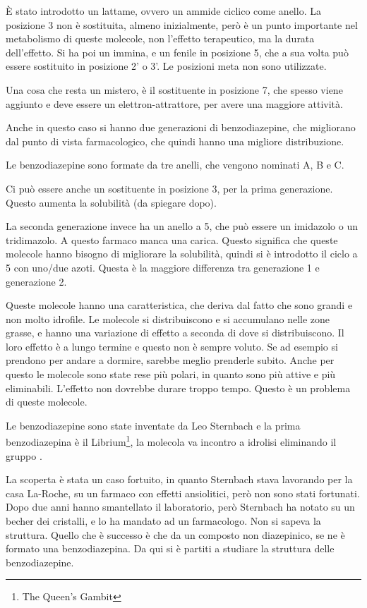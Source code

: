 È stato introdotto un lattame, ovvero un ammide ciclico come anello. La
posizione 3 non è sostituita, almeno inizialmente, però è un punto
importante nel metabolismo di queste molecole, non l'effetto
terapeutico, ma la durata dell'effetto.
Si ha poi un immina, e un fenile in posizione 5, che a sua volta può
essere sostituito in posizione 2' o 3'.
Le posizioni meta non sono utilizzate.

Una cosa che resta un mistero, è il sostituente in posizione 7, che
spesso viene aggiunto e deve essere un elettron-attrattore, per avere
una maggiore attività.


Anche in questo caso si hanno due generazioni di benzodiazepine, che
migliorano dal punto di vista farmacologico, che quindi hanno una
migliore distribuzione.

Le benzodiazepine sono formate da tre anelli, che vengono nominati A, B e C.

Ci può essere anche un sostituente in posizione 3, per la prima
generazione. Questo aumenta la solubilità (da spiegare dopo).

La seconda generazione invece ha un anello a 5, che può essere un
imidazolo o un tridimazolo. A questo farmaco manca una carica. Questo
significa che queste molecole hanno bisogno di migliorare la solubilità,
quindi si è introdotto il ciclo a 5 con uno/due azoti. Questa è la
maggiore differenza tra generazione 1 e generazione 2.

Queste molecole hanno una caratteristica, che deriva dal fatto che sono
grandi e non molto idrofile. Le molecole si distribuiscono e si
accumulano nelle zone grasse, e hanno una variazione di effetto a
seconda di dove si distribuiscono. Il loro effetto è a lungo termine e
questo non è sempre voluto. Se ad esempio si prendono per andare a
dormire, sarebbe meglio prenderle subito. Anche per questo le molecole
sono state rese più polari, in quanto sono più attive e più eliminabili.
L'effetto non dovrebbe durare troppo tempo. Questo è un problema di
queste molecole.

Le benzodiazepine sono state inventate da Leo Sternbach e la prima
benzodiazepina è il Librium\footnote{The Queen's Gambit}, la molecola va
incontro a idrolisi eliminando il gruppo .

La scoperta è stata un caso fortuito, in quanto Sternbach stava
lavorando per la casa La-Roche, su un farmaco con effetti ansiolitici,
però non sono stati fortunati. Dopo due anni hanno smantellato il
laboratorio, però Sternbach ha notato su un becher dei cristalli, e lo
ha mandato ad un farmacologo. Non si sapeva la struttura. Quello che è
successo è che da un composto non diazepinico, se ne è formato una
benzodiazepina. Da qui si è partiti a studiare la struttura delle
benzodiazepine.

